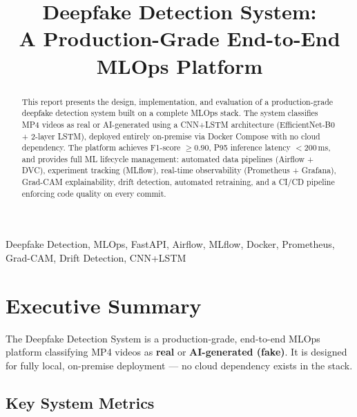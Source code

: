 \documentclass[conference]{IEEEtran}
\begin{document}
\title{Deepfake Detection System:\\
       A Production-Grade End-to-End MLOps Platform}

\author{%
}

\maketitle

\begin{abstract}
This report presents the design, implementation, and evaluation of a production-grade deepfake detection system built on a complete MLOps stack. The system classifies MP4 videos as real or AI-generated using a CNN+LSTM architecture (EfficientNet-B0 + 2-layer LSTM), deployed entirely on-premise via Docker Compose with no cloud dependency. The platform achieves F1-score $\geq 0.90$, P95 inference latency $<200\,\text{ms}$, and provides full ML lifecycle management: automated data pipelines (Airflow + DVC), experiment tracking (MLflow), real-time observability (Prometheus + Grafana), Grad-CAM explainability, drift detection, automated retraining, and a CI/CD pipeline enforcing code quality on every commit.
\end{abstract}

\begin{IEEEkeywords}
Deepfake Detection, MLOps, FastAPI, Airflow, MLflow, Docker, Prometheus, Grad-CAM, Drift Detection, CNN+LSTM
\end{IEEEkeywords}

\section{Executive Summary}
\label{sec:summary}

The Deepfake Detection System is a production-grade, end-to-end MLOps platform classifying MP4 videos as \textbf{real} or \textbf{AI-generated (fake)}. It is designed for fully local, on-premise deployment — no cloud dependency exists in the stack.

\subsection*{Key System Metrics}
\end{document}
